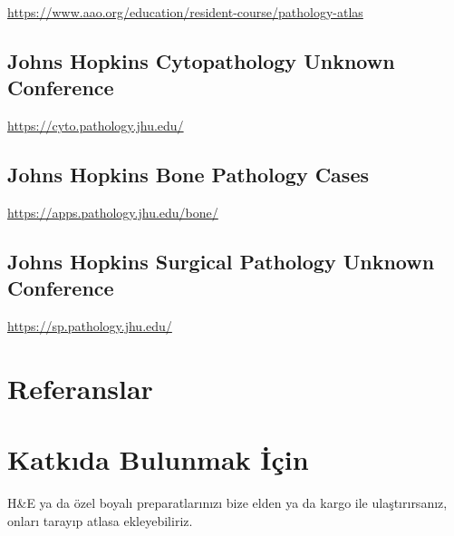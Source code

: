 \documentclass[
  letterpaper,
  DIV=11,
  numbers=noendperiod]{scrreprt}
\newlength{\cslhangindent}
\newlength{\cslentryspacingunit} %
\newenvironment{CSLReferences}[2] %
 {%
  \setlength{\parindent}{0pt}
  \ifodd #1
  \let\oldpar\par
  \def\par{\hangindent=\cslhangindent\oldpar}
  \fi
  \setlength{\parskip}{#2\cslentryspacingunit}
 }%
 {}
\begin{document}
\url{https://www.aao.org/education/resident-course/pathology-atlas}

\hypertarget{johns-hopkins-cytopathology-unknown-conference}{%
\section{Johns Hopkins Cytopathology Unknown
Conference}\label{johns-hopkins-cytopathology-unknown-conference}}

\url{https://cyto.pathology.jhu.edu/}

\hypertarget{johns-hopkins-bone-pathology-cases}{%
\section{Johns Hopkins Bone Pathology
Cases}\label{johns-hopkins-bone-pathology-cases}}

\url{https://apps.pathology.jhu.edu/bone/}

\hypertarget{johns-hopkins-surgical-pathology-unknown-conference}{%
\section{Johns Hopkins Surgical Pathology Unknown
Conference}\label{johns-hopkins-surgical-pathology-unknown-conference}}

\url{https://sp.pathology.jhu.edu/}


\hypertarget{referanslar}{%
\chapter*{Referanslar}\label{referanslar}}


\hypertarget{refs}{}
\begin{CSLReferences}{0}{0}
\end{CSLReferences}

\cleardoublepage
{}
{}
\appendix

\hypertarget{sec-katki}{%
\chapter{Katkıda Bulunmak İçin}\label{sec-katki}}

H\&E ya da özel boyalı preparatlarınızı bize elden ya da kargo ile
ulaştırırsanız, onları tarayıp atlasa ekleyebiliriz.
\end{document}
